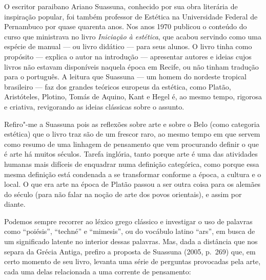 O escritor paraibano Ariano Suassuna, conhecido por sua obra literária
de inspiração popular, foi também professor de Estética na Universidade
Federal de Pernambuco por quase quarenta anos. Nos anos 1970 publicou o
conteúdo do curso que ministrava no livro \emph{Iniciação à estética},
que acabou servindo como uma espécie de manual --- ou livro didático ---
para seus alunos. O livro tinha como propósito --- explica o autor na
introdução --- apresentar autores e ideias cujos livros não estavam
disponíveis naquela época em Recife, ou não tinham tradução para o
português. A leitura que Suassuna --- um homem do nordeste tropical
brasileiro --- faz dos grandes teóricos europeus da estética, como
Platão, Aristóteles, Plotino, Tomás de Aquino, Kant e Hegel é, ao mesmo
tempo, rigorosa e criativa, revigorando as ideias clássicas sobre o
assunto.

Refiro"-me a Suassuna pois as reflexões sobre arte e sobre o Belo (como
categoria estética) que o livro traz são de um frescor raro, ao mesmo
tempo em que servem como resumo de uma linhagem de pensamento que vem
procurando definir o que é arte há muitos séculos. Tarefa inglória,
tanto porque arte é uma das atividades humanas mais difíceis de enquadrar
numa definição categórica, como porque essa mesma definição está
condenada a se transformar conforme a época, a cultura e o local. O que
era arte na época de Platão passou a ser outra coisa para os alemães do
século  (para não falar na noção de arte dos povos orientais), e
assim por diante.

Podemos sempre recorrer ao léxico grego clássico e investigar o uso de
palavras como ``poiésis'', ``techné'' e ``mimesis'', ou do vocábulo
latino ``ars'', em busca de um significado latente no interior dessas
palavras. Mas, dada a distância que nos separa da Grécia Antiga, prefiro
a proposta de Suassuna (2005, p.~269) que, em certo momento de seu
livro, levanta uma série de perguntas provocadas pela arte, cada uma
delas relacionada a uma corrente de pensamento:


